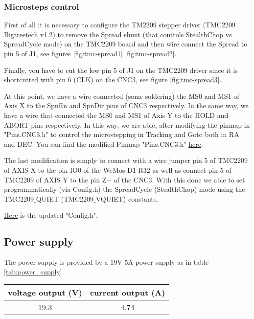 \subsubsection{Microsteps control}
First of all it is necessary to configure the TM2209 stepper driver (TMC2209 Bigtreetech v1.2) to remove the Spread shunt (that controls StealthChop vs SpreadCycle mode) on the TMC2209 board and then wire connect the Spread to pin 5 of J1, see figures \ref{fig:tmc-spread1} \ref{fig:tmc-spread2}.

Finally, you have to cut the low pin 5 of J1 on the TMC2209 driver since it is shortcutted with pin 6 (CLK) on the CNC3, see figure \ref{fig:tmc-spread3}.

At this point, we have a wire connected (some soldering) the MS0 and MS1 of Axis X to the SpnEn and SpnDir pins of CNC3 respectively. In the same way, we have a wire that connected the MS0 and MS1 of Axis Y to the HOLD and ABORT pins respectively. In this way, we are able, after modifying the pinmap in "Pins.CNC3.h" to control the microstepping in Tracking and Goto both in RA and DEC.
You can find the modified Pinmap "Pins.CNC3.h" \href{https://github.com/sebastiano123-c/Motorize-a-1980-telescope/blob/main/OnStep/src/pinmaps/Pins.CNC3.h}{here}.

The last modification is simply to connect with a wire jumper pin 5 of TMC2209 of AXIS X to the pin IO0 of the WeMos D1 R32 as well as connect pin 5 of TMC2209 of AXIS Y to the pin Z\(-\) of the CNC3.
With this done we able to set programmatically (via Config.h) the SpreadCycle (StealthChop) mode using the TMC2209\(\_\)QUIET (TMC2209\(\_\)VQUIET) constants.

\href{https://github.com/sebastiano123-c/Motorize-a-1980-telescope/blob/main/OnStep/Config.h}{Here} is the updated "Config.h".

\subsection{Power supply}
The power supply is provided by a 19V 5A power supply as in table \ref{tab:power_supply}.

\begin{minipage}
    {.4\textwidth}
    \begin{tabular}{cc}
         voltage output (V) & current output (A) \\
         \hline
        19.3 & 4.74 \\
    \end{tabular}
    \label{tab:power_supply}
\end{minipage}

